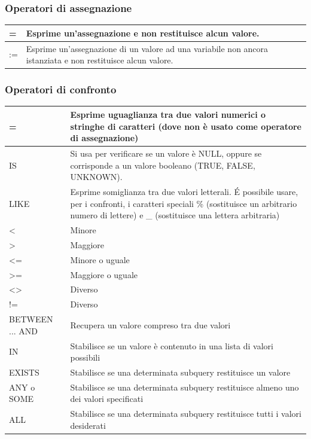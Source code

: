 \documentclass[a4paper]{article}
\begin{document}
\subsubsection{Operatori di assegnazione}
\begin{tabularx}{350pt}{|l|X|}
  \hline
  = & Esprime un'assegnazione e non restituisce alcun valore.\\
  \hline
  := & Esprime un'assegnazione di un valore ad una variabile non ancora istanziata e non restituisce alcun valore.\\
  \hline
\end{tabularx}

\subsubsection{Operatori di confronto}
\begin{tabularx}{350pt}{|l|X|}
  \hline
  = &  Esprime uguaglianza tra due valori numerici o stringhe di caratteri (dove non è usato come operatore di assegnazione)\\
  \hline
  IS & Si usa per verificare se un valore è NULL, oppure se corrisponde a un valore booleano (TRUE, FALSE, UNKNOWN).\\
  \hline
  LIKE & Esprime somiglianza tra due valori letterali. É possibile usare, per i confronti, i caratteri speciali \% (sostituisce un arbitrario numero di lettere) e \_ (sostituisce una lettera arbitraria)\\
  \hline
  < & Minore\\
  \hline
  > & Maggiore\\
  \hline
  <= & Minore o uguale\\
  \hline
  >= & Maggiore o uguale\\
  \hline
  <> & Diverso\\
  \hline
  != & Diverso\\
  \hline
  BETWEEN ... AND & Recupera un valore compreso tra due valori\\
  \hline
  IN & Stabilisce se un valore è contenuto in una lista di valori possibili\\
  \hline
  EXISTS & Stabilisce se una determinata subquery restituisce un valore\\
  \hline
  ANY o SOME & Stabilisce se una determinata subquery restituisce almeno uno dei valori specificati\\
  \hline
  ALL & Stabilisce se una determinata subquery restituisce tutti i valori desiderati\\
  \hline
\end{tabularx}
\end{document}
